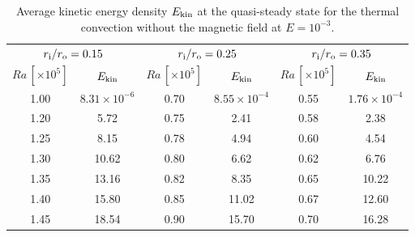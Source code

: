 \begin{table}
\caption{Average kinetic energy density $E_{\rm kin}$ at the quasi-steady state for the thermal convection without the magnetic field at $E =  10^{-3}$.}
\begin{center}
\begin{tabular}{|cc|cc|cc|}
   \hline
  \multicolumn{2}{|c|}{$r_{\rm i}/r_{\rm o} = 0.15$} &
  \multicolumn{2}{c|}{$r_{\rm i}/r_{\rm o} = 0.25$} &
  \multicolumn{2}{c|}{$r_{\rm i}/r_{\rm o} = 0.35$} \\
  $Ra \, [\times 10^5] $ &  $E_{\rm kin}$ &
  $Ra \, [\times 10^5] $ &  $E_{\rm kin}$ &
  $Ra \, [\times 10^5] $ &  $E_{\rm kin}$ \\
    \hline
   1.00  &  $8.31 \times 10^{-6}$ &  0.70 &  $8.55 \times 10^{-4}$ &  0.55  &  $1.76 \times 10^{-4}$ \\
   1.20  &  5.72 & 0.75 &  2.41 &  0.58  &  2.38\\
   1.25 &  8.15 &  0.78  &  4.94 &  0.60  &  4.54\\
   1.30  &  10.62 &  0.80  &  6.62 &  0.62  &  6.76  \\
   1.35 &  13.16 &  0.82  & 8.35 &  0.65  &  10.22 \\
   1.40  &  15.80 &  0.85  &  11.02 &  0.67  &  12.60 \\
   1.45  &  18.54 &  0.90  &  15.70 &  0.70  &  16.28\\
 \hline
\end{tabular}
\end{center}
\label{table:Rac}
\end{table}
